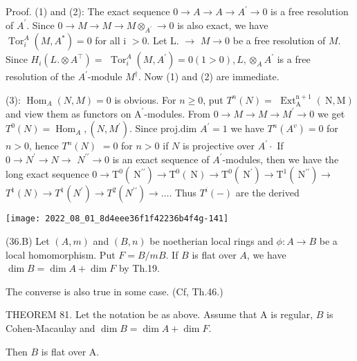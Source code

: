 Proof. (1) and (2): The exact sequence $0 \rightarrow A \rightarrow A \rightarrow A^{\prime} \rightarrow 0$ is a free resolution of $A^{\prime}$. Since $0 \rightarrow M \rightarrow M \rightarrow M \otimes_{A^{\prime}} \rightarrow 0$ is also exact, we have $\operatorname{Tor}_{i}^{A}\left(M, A^{*}\right)=0$ for all i $>0$. Let L. $\rightarrow$ $M \rightarrow 0$ be a free resolution of $M$. Since $H_{i}\left(L . \otimes A^{\top}\right)=$ $\operatorname{Tor}_{i}^{A}\left(M, A^{\prime}\right)=0(1>0), L, \otimes_{A} A^{\prime}$ is a free resolution of the $A^{\prime}$-module $M^{\dagger}$. Now (1) and (2) are immediate.

(3): $\operatorname{Hom}_{A}(N, M)=0$ is obvious. For $n \geqslant 0$, put $T^{n}(N)=$ $\operatorname{Ext}_{\mathrm{A}}^{\mathrm{n}+1}(\mathrm{~N}, \mathrm{M})$ and view them as functors on $\mathrm{A}^{\prime}$-modules. From $0 \rightarrow M \rightarrow M \rightarrow M^{\prime} \rightarrow 0$ we get $T^{0}(N)=\operatorname{Hom}_{A},\left(N, M^{\prime}\right)$. Since proj.dim $A^{\prime}=1$ we have $T^{n}\left(A^{v}\right)=0$ for $n>0$, hence $T^{n}(N)$ $=0$ for $n>0$ if $N$ is projective over $A^{\prime} \cdot$ If $0 \rightarrow N^{\prime} \rightarrow N \rightarrow$ $N^{\prime \prime} \rightarrow 0$ is an exact sequence of $A^{\prime}$-modules, then we have the long exact sequence $0 \rightarrow \mathrm{T}^{0}\left(\mathrm{~N}^{\prime \prime}\right) \rightarrow \mathrm{T}^{0}(\mathrm{~N}) \rightarrow \mathrm{T}^{0}\left(\mathrm{~N}^{\prime}\right) \rightarrow \mathrm{T}^{1}\left(\mathrm{~N}^{\prime \prime}\right) \rightarrow$ $T^{1}(N) \rightarrow T^{1}\left(N^{\prime}\right) \rightarrow T^{2}\left(N^{\prime \prime}\right) \rightarrow \ldots$. Thus $T^{i}(-)$ are the derived

\texttt{[image: 2022\_08\_01\_8d4eee36f1f42236b4f4g-141]}

(36.B) Let $(A, m)$ and $(B, n)$ be noetherian local rings and $\phi: A \rightarrow B$ be a local homomorphism. Put $F=B / m B$. If $B$ is flat over $A$, we have $\operatorname{dim} B=\operatorname{dim} A+\operatorname{dim} F$ by Th.19.

The converse is also true in some case. (Cf, Th.46.)

THEOREM 81. Let the notation be as above. Assume that A is regular, $B$ is Cohen-Macaulay and $\operatorname{dim} B=\operatorname{dim} A+\operatorname{dim} F$.

Then $B$ is flat over A.


